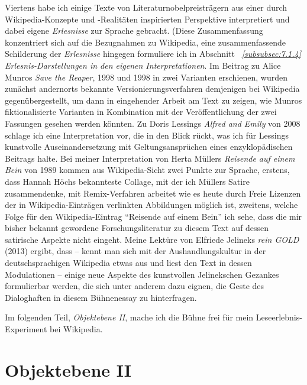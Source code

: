 \documentclass[fontsize=12pt]{scrartcl}
\begin{document}
Viertens habe ich einige Texte von Li\-te\-ra\-tur\-nobelpreistr\"agern\textsuperscript{\tiny *} aus einer durch Wikipedia-Konzepte und -Realit\"aten inspirierten Perspektive interpretiert und dabei ei\-ge\-ne \textit{Erlesnisse} zur Sprache gebracht. (Diese Zusammenfassung konzentriert sich auf die Bezugnahmen zu Wi\-ki\-pe\-dia, eine zusammenfassende Schilderung der \textit{Erlesnisse} hingegen formuliere ich in Abschnitt \textit{~\ref{subsubsec:7.1.4} \textit{Erlesnis}-Darstellungen in den eigenen Interpretationen}. Im Beitrag zu Alice Munros \textit{Save the Reaper}, 1998 und 1998 in zwei Varianten erschienen, wurden zun\"achst andernorts be\-kann\-te Versionierungsverfahren demjenigen bei Wi\-ki\-pe\-dia gegen\"ubergestellt, um dann in eingehender Arbeit am Text zu zeigen, wie Munros fiktionalisierte Varianten in Kombination mit der Ver\"of\-fent\-lichung der zwei Fassungen gesehen werden k\"onnten. Zu Doris Lessings \textit{Alfred and Emily} von 2008 schlage ich eine Interpretation vor, die in den Blick r\"uckt, was ich f\"ur Lessings kunstvolle Auseinandersetzung mit Geltungsanspr\"uchen eines enzyklop\"adischen Beitrags halte. Bei meiner Interpretation von Herta M\"ullers \textit{Reisende auf einem Bein} von 1989 kommen aus Wi\-ki\-pe\-dia-Sicht zwei Punkte zur Sprache, erstens, dass Hannah H\"ochs bekannteste Collage, mit der ich M\"ullers Satire zusammendenke, mit Remix-Verfahren arbeitet wie es heute durch Freie Lizenzen der in Wi\-ki\-pe\-dia-Eintr\"agen verlinkten Abbildungen m\"oglich ist, zwei\-tens, welche Folge f\"ur den Wi\-ki\-pe\-dia-Eintrag "`Reisende auf einem Bein"' ich sehe, dass die mir bis\-her bekannt gewordene For\-schungsli\-te\-ra\-tur zu diesem Text auf dessen satirische Aspekte nicht eingeht. Meine Lekt\"ure von Elfriede Jelineks \textit{rein GOLD} (2013) ergibt, dass -- kennt man sich mit der Aushandlungskultur in der deutschspra\-chi\-gen Wi\-ki\-pe\-dia etwas aus und liest den Text in dessen Modulationen -- einige neue Aspekte des kunstvollen Jelinekschen Gezankes formulierbar werden, die sich unter anderem dazu eignen, die Geste des Dialoghaften in diesem B\"uhnenessay zu hinterfragen.

Im folgenden Teil, \textit{Objektebene II}, mache ich die B\"uhne frei f\"ur mein Leseerlebnis-Experiment bei Wi\-ki\-pe\-dia. 

\pagebreak

\section{Objektebene II}
\label{sec:6}
\end{document}
